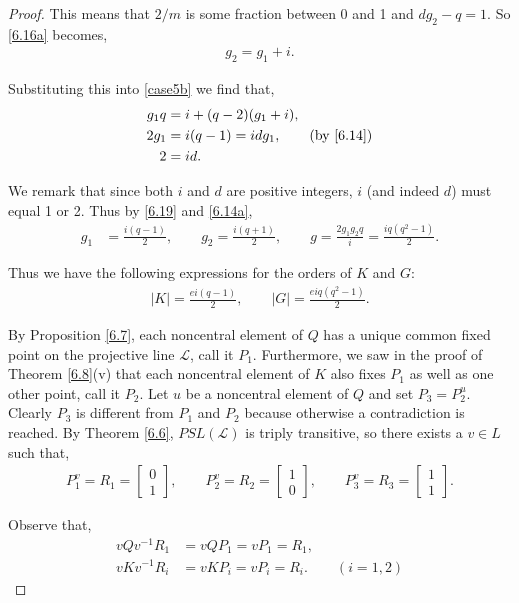 \begin{proof}
This means that $2/m$ is some fraction between 0 and 1 and $d g_2 - q = 1$. So \eqref{6.16a} becomes,
\begin{align}\label{6.19} g_2 = g_1 + i.
\end{align}

Substituting this into \eqref{case5b} we find that,
\begin{align*} g_1 q &= i + (q - 2)(g_1 + i),
\\ 2 g_1 &= i(q - 1) = i d g_1, \tag{by \eqref{6.14}}
\\ 2 &= i d.
\end{align*}

We remark that since both $i$ and $d$ are positive integers, $i$ (and indeed $d$) must equal 1 or 2. Thus by \eqref{6.19} and \eqref{6.14a},
\begin{align*} g_1 &= \frac{i(q-1)}{2}, \qquad g_2 = \frac{i(q + 1)}{2}, \qquad g = \frac{2 g_1 g_2 q}{i} = \frac{iq(q^2 - 1)}{2}.
\end{align*}

Thus we have the following expressions for the orders of $K$ and $G$:
\begin{align}\label{orderGK} |K| = \frac{ei(q-1)}{2}, \qquad |G| = \frac{eiq(q^2-1)}{2}.
\end{align}

By Proposition \ref{6.7}, each noncentral element of $Q$ has a unique common fixed point on the projective line $\mathscr{L}$, call it $P_1$. Furthermore, we saw in the proof of Theorem \ref{6.8}(v) that each noncentral element of $K$ also fixes $P_1$ as well as one other point, call it $P_2$. Let $u$ be a noncentral element of $Q$ and set $P_3 = P_2^u$. Clearly $P_3$ is different from $P_1$ and $P_2$ because otherwise a contradiction is reached. By Theorem \ref{6.6}, $PSL(\mathscr{L})$ is triply transitive, so there exists a $v \in L$ such that,
\begin{align*} P_1^v = R_1 = \begin{bmatrix} 0 \\ 1 \end{bmatrix}, \qquad P_2^v = R_2 = \begin{bmatrix} 1 \\ 0 \end{bmatrix}, \qquad P_3^v = R_3 = \begin{bmatrix} 1 \\ 1 \end{bmatrix}.
\end{align*} 

Observe that,
\begin{align*} vQv^{-1}R_1 &= vQP_1 = vP_1 = R_1,
\\ vKv^{-1}R_i &= vKP_i = vP_i = R_i. \qquad (i=1,2)
\end{align*} 


\end{proof}
